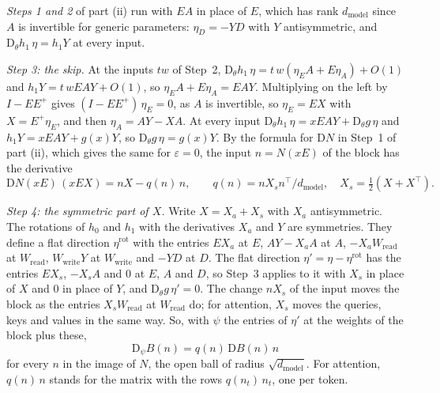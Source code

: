 \documentclass[10pt]{article}
\theoremstyle{definition}
\theoremstyle{remark}
\newcommand{\Wread}{W_{\mathrm{read}}}
\newcommand{\Wwrite}{W_{\mathrm{write}}}
\newcommand{\dm}{d_{\mathrm{model}}}
\newcommand{\Der}{\mathrm{D}}
\begin{document}
\emph{Steps 1 and 2} of part (ii) run with $EA$ in place of $E$, which has rank $\dm$ since $A$ is invertible for generic parameters: $\eta_D = -YD$ with $Y$ antisymmetric, and $\Der_\theta h_1\,\eta = h_1Y$ at every input.

\emph{Step 3: the skip.} At the inputs $tw$ of Step~2, $\Der_\theta h_1\,\eta = t\,w(\eta_EA + E\eta_A) + O(1)$ and $h_1Y = t\,wEAY + O(1)$, so $\eta_EA + E\eta_A = EAY$. Multiplying on the left by $I - EE^+$ gives $(I - EE^+)\,\eta_E = 0$, as $A$ is invertible, so $\eta_E = EX$ with $X = E^+\eta_E$, and then $\eta_A = AY - XA$. At every input $\Der_\theta h_1\,\eta = xEAY + \Der_\theta g\,\eta$ and $h_1Y = xEAY + g(x)Y$, so $\Der_\theta g\,\eta = g(x)Y$. By the formula for $\Der N$ in Step~1 of part (ii), which gives the same for $\varepsilon = 0$, the input $n = N(xE)$ of the block has the derivative
\[
\Der N(xE)\,(xEX) = nX - q(n)\,n, \qquad q(n) = nX_sn^\top/\dm, \quad X_s = \tfrac12(X + X^\top).
\]

\emph{Step 4: the symmetric part of $X$.} Write $X = X_a + X_s$ with $X_a$ antisymmetric. The rotations of $h_0$ and $h_1$ with the derivatives $X_a$ and $Y$ are symmetries. They define a flat direction $\eta^{\mathrm{rot}}$ with the entries $EX_a$ at $E$, $AY - X_aA$ at $A$, $-X_a\Wread$ at $\Wread$, $\Wwrite Y$ at $\Wwrite$ and $-YD$ at $D$. The flat direction $\eta' = \eta - \eta^{\mathrm{rot}}$ has the entries $EX_s$, $-X_sA$ and $0$ at $E$, $A$ and $D$, so Step~3 applies to it with $X_s$ in place of $X$ and $0$ in place of $Y$, and $\Der_\theta g\,\eta' = 0$. The change $nX_s$ of the input moves the block as the entries $X_s\Wread$ at $\Wread$ do; for attention, $X_s$ moves the queries, keys and values in the same way. So, with $\psi$ the entries of $\eta'$ at the weights of the block plus these,
\begin{equation}\label{eq:partc}
\Der_\psi B(n) = q(n)\,\Der B(n)\,n
\end{equation}
for every $n$ in the image of $N$, the open ball of radius $\sqrt{\dm}$. For attention, $q(n)\,n$ stands for the matrix with the rows $q(n_t)\,n_t$, one per token.
\end{document}
